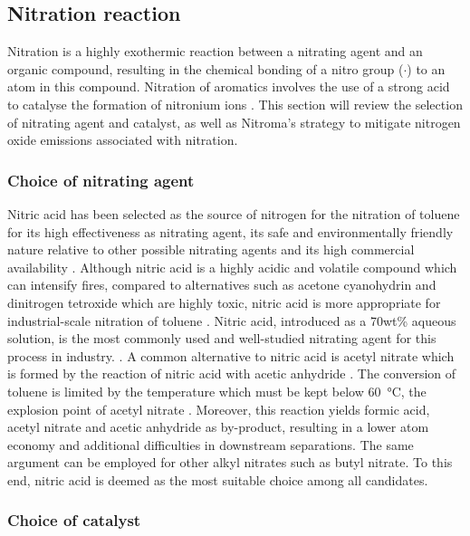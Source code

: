 \subsection{Nitration reaction}

Nitration is a highly exothermic reaction between a nitrating agent and an organic compound, resulting in the chemical bonding of a nitro group ($\cdot$) to an atom in this compound. Nitration of aromatics involves the use of a strong acid to catalyse the formation of nitronium ions . This section will review the selection of nitrating agent and catalyst, as well as Nitroma's strategy to mitigate nitrogen oxide emissions associated with nitration.

\subsubsection{Choice of nitrating agent}

Nitric acid has been selected as the source of nitrogen for the nitration of toluene for its high effectiveness as nitrating agent, its safe and environmentally friendly nature relative to other possible nitrating agents and its high commercial availability \cite{miller_kinetics_1964, sreedhar_scientific_2013}. Although nitric acid is a highly acidic and volatile compound which can intensify fires, compared to alternatives such as acetone cyanohydrin and dinitrogen tetroxide which are highly toxic, nitric acid is more appropriate for industrial-scale nitration of toluene \cite{dagade_nitration_2002, sreedhar_scientific_2013}. Nitric acid, introduced as a 70wt\% aqueous solution, is the most commonly used and well-studied nitrating agent for this process in industry. \cite{bowers_toluidines_2000}. A common alternative to nitric acid is acetyl nitrate which is formed by the reaction of nitric acid with acetic anhydride \cite{vassena_selective_1999}. The conversion of toluene is limited by the temperature which must be kept below \SI{60}{\celsius}, the explosion point of acetyl nitrate \cite{kuba_batch_2007}. Moreover, this reaction yields formic acid, acetyl nitrate and acetic anhydride as by-product, resulting in a lower atom economy and additional difficulties in downstream separations. The same argument can be employed for other alkyl nitrates such as butyl nitrate. To this end, nitric acid is deemed as the most suitable choice among all candidates.


\subsubsection{Choice of catalyst}

